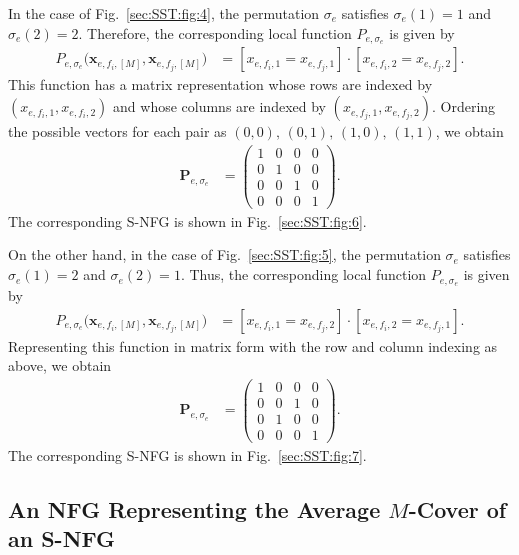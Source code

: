 \documentclass[journal]{IEEEtran}
\newcommand{\add}[1]{{\color{black}#1}}
\newcommand{\vect}[1]{ \bm{#1} }
\newcommand{\vx}{ \vect{x} }
\newcommand{\matr}[1]{\vect{#1}}
\newcommand{\efi}{ e,f_i }
\newcommand{\efj}{ e,f_j }
\begin{document}
In the case of Fig.~\ref{sec:SST:fig:4}, the permutation
$\sigma_e$ satisfies $\sigma_e(1) = 1$ and $\sigma_e(2) = 2$. Therefore, the corresponding local function $P_{e,\sigma_e}$ is given by
\begin{align*}
  P_{e,\sigma_e}\bigl( \vx_{\efi,[M]}, \vx_{\efj,[M]} \bigr)
   & =
  [x_{\efi,1} \! = \! x_{\efj,1}]
  \cdot
  [x_{\efi,2} \! = \! x_{\efj,2}].
\end{align*}
\add{This function has a matrix representation whose rows are indexed by
  $(x_{\efi,1}, x_{\efi,2}) $ and whose columns are indexed by
  $(x_{\efj,1}, x_{\efj,2})$. Ordering the possible vectors for each pair as
  $ (0,0), \, (0,1), \, (1,0), \, (1,1) $, we obtain}
\begin{align*}
  \matr{P}_{e,\sigma_e}
   & = \begin{pmatrix}
         1 & 0 & 0 & 0 \\
         0 & 1 & 0 & 0 \\
         0 & 0 & 1 & 0 \\
         0 & 0 & 0 & 1
       \end{pmatrix}.
\end{align*}
The corresponding S-NFG is shown in Fig.~\ref{sec:SST:fig:6}.

On the other hand, in the case of Fig.~\ref{sec:SST:fig:5}, the
permutation $\sigma_e$ satisfies $\sigma_e(1) = 2$ and $\sigma_e(2) = 1$.  Thus, the corresponding local function $P_{e,\sigma_e}$ is given by
\begin{align*}
  P_{e,\sigma_e}\bigl( \vx_{\efi,[M]}, \vx_{\efj,[M]} \bigr)
   & =
  [x_{\efi,1} \! = \! x_{\efj,2}]
  \cdot
  [x_{\efi,2} \! = \! x_{\efj,1}].
\end{align*}
\add{Representing this function in matrix form with the row and column indexing as above, we obtain}
\begin{align*}
  \matr{P}_{e,\sigma_e}
   & = \begin{pmatrix}
         1 & 0 & 0 & 0 \\
         0 & 0 & 1 & 0 \\
         0 & 1 & 0 & 0 \\
         0 & 0 & 0 & 1
       \end{pmatrix}.
\end{align*}
The corresponding S-NFG is shown in Fig.~\ref{sec:SST:fig:7}.

\subsection{An NFG Representing the Average \texorpdfstring{$M$}{}-Cover
  of an S-NFG}
\label{sec:sst:NFG:average:cover:1}
\end{document}
